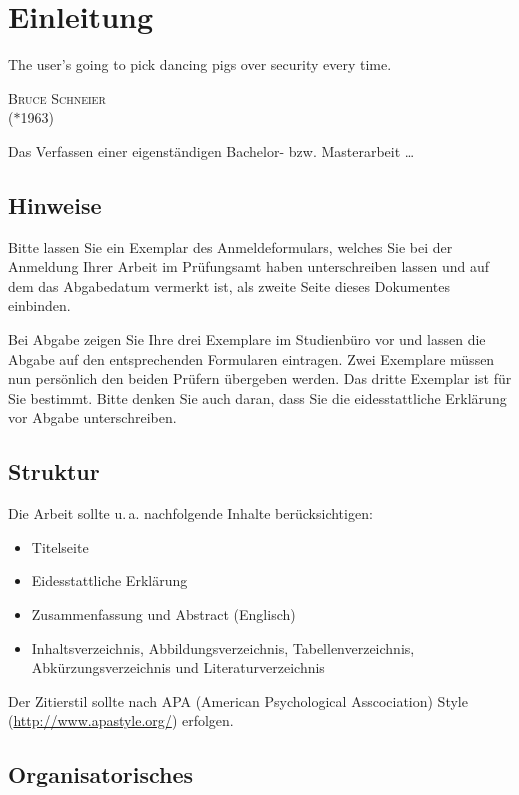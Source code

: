 \chapter{Einleitung}

\epigraph{\glqq The user's going to pick dancing pigs over security every time.\grqq\bigskip}
{\textsc{Bruce Schneier}\\ ($\ast$1963)}

\noindent
Das Verfassen einer eigenständigen Bachelor- bzw. Masterarbeit \dots
\indent

\section{Hinweise}

Bitte lassen Sie ein Exemplar des Anmeldeformulars, welches Sie bei der Anmeldung Ihrer Arbeit im Prüfungsamt haben unterschreiben lassen und auf dem das Abgabedatum vermerkt ist, als zweite Seite dieses Dokumentes einbinden.

Bei Abgabe zeigen Sie Ihre drei Exemplare im Studienbüro vor und lassen die Abgabe auf den entsprechenden Formularen eintragen. Zwei Exemplare müssen nun persönlich den beiden Prüfern übergeben werden. Das dritte Exemplar ist für Sie bestimmt.
Bitte denken Sie auch daran, dass Sie die eidesstattliche Erklärung vor Abgabe unterschreiben.

\section{Struktur}

Die Arbeit sollte u.\,a. nachfolgende Inhalte berücksichtigen:

\begin{itemize}
  \item Titelseite
  \item Eidesstattliche Erklärung
  \item Zusammenfassung und Abstract (Englisch)
  \item Inhaltsverzeichnis, Abbildungsverzeichnis, Tabellenverzeichnis, Abkürzungsverzeichnis und Literaturverzeichnis
\end{itemize}

\noindent
Der Zitierstil sollte nach APA (American Psychological Asscociation) Style (\url{http://www.apastyle.org/}) erfolgen.

\section{Organisatorisches}

